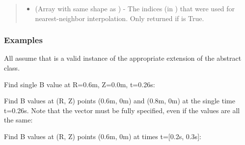 \documentclass[letterpaper,10pt,english]{sphinxmanual}
\begin{document}
\begin{fulllineitems}
\begin{fulllineitems}
\begin{quote}
\begin{description}
\begin{itemize}
\item {} 
 (Array with same shape as ) - The indices
(in ) that were used for
nearest-neighbor interpolation. Only returned if  is
True.

\end{itemize}


\end{description}\end{quote}
\subsubsection*{Examples}

All assume that  is a valid instance of the
appropriate extension of the {\hyperref[\detokenize{eqtools:eqtools.core.Equilibrium}]{}} abstract class.

Find single B value at R=0.6m, Z=0.0m, t=0.26s:

\begin{sphinxVerbatim}[commandchars=\\\{\}]
    
\end{sphinxVerbatim}

Find B values at (R, Z) points (0.6m, 0m) and (0.8m, 0m) at the
single time t=0.26s. Note that the  vector must be fully specified,
even if the values are all the same:

\begin{sphinxVerbatim}[commandchars=\\\{\}]
  \PYG{p}{[} \PYG{p}{]} \PYG{p}{[} \PYG{p}{]} 
\end{sphinxVerbatim}

Find B values at (R, Z) points (0.6m, 0m) at times t={[}0.2s, 0.3s{]}:

\begin{sphinxVerbatim}[commandchars=\\\{\}]
    \PYG{p}{[} \PYG{p}{]}
\end{sphinxVerbatim}


\end{fulllineitems}
\end{fulllineitems}
\end{document}
